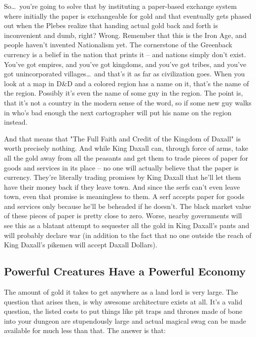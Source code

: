 So\ldots\  you're going to solve that by instituting a paper-based exchange system where initially the paper is exchangeable for gold and that eventually gets phased out when the Plebes realize that handing actual gold back and forth is inconvenient and dumb, right? Wrong. Remember that this is the Iron Age, and people haven't invented Nationalism yet. The cornerstone of the Greenback currency is a belief in the nation that prints it -- and nations simply don't exist. You've got empires, and you've got kingdoms, and you've got tribes, and you've got unincorporated villages\ldots\  and that's it as far as civilization goes. When you look at a map in D\&D and a colored region has a name on it, that's the name of the region. Possibly it's even the name of some guy in the region. The point is, that it's not a country in the modern sense of the word, so if some new guy walks in who's bad enough the next cartographer will put his name on the region instead.

And that means that "The Full Faith and Credit of the Kingdom of Daxall" is worth precisely nothing. And while King Daxall can, through force of arms, take all the gold away from all the peasants and get them to trade pieces of paper for goods and services in its place -- no one will actually believe that the paper is currency. They're literally trading promises by King Daxall that he'll let them have their money back if they leave town. And since the serfs can't even leave town, even that promise is meaningless to them. A serf accepts paper for goods and services only because he'll be beheaded if he doesn't. The black market value of these pieces of paper is pretty close to zero. Worse, nearby governments will see this as a blatant attempt to sequester all the gold in King Daxall's pants and will probably declare war (in addition to the fact that no one outside the reach of King Daxall's pikemen will accept Daxall Dollars).

\subsection{Powerful Creatures Have a Powerful Economy}

The amount of gold it takes to get anywhere as a land lord is very large. The question that arises then, is why awesome architecture exists at all. It's a valid question, the listed costs to put things like pit traps and thrones made of bone into your dungeon are stupendously large and actual magical swag can be made available for much less than that. The answer is that:

